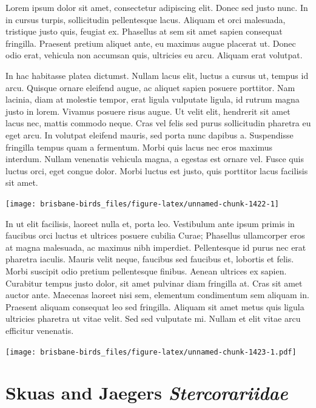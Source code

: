 \documentclass[]{book}
\let\origfigure\figure
\let\endorigfigure\endfigure
\renewenvironment{figure}[1][2] {
  \expandafter\origfigure\expandafter[H]
} {
  \endorigfigure
}
\begin{document}
Lorem ipsum dolor sit amet, consectetur adipiscing elit. Donec sed justo
nunc. In in cursus turpis, sollicitudin pellentesque lacus. Aliquam et
orci malesuada, tristique justo quis, feugiat ex. Phasellus at sem sit
amet sapien consequat fringilla. Praesent pretium aliquet ante, eu
maximus augue placerat ut. Donec odio erat, vehicula non accumsan quis,
ultricies eu arcu. Aliquam erat volutpat.

In hac habitasse platea dictumst. Nullam lacus elit, luctus a cursus ut,
tempus id arcu. Quisque ornare eleifend augue, ac aliquet sapien posuere
porttitor. Nam lacinia, diam at molestie tempor, erat ligula vulputate
ligula, id rutrum magna justo in lorem. Vivamus posuere risus augue. Ut
velit elit, hendrerit sit amet lacus nec, mattis commodo neque. Cras vel
felis sed purus sollicitudin pharetra eu eget arcu. In volutpat eleifend
mauris, sed porta nunc dapibus a. Suspendisse fringilla tempus quam a
fermentum. Morbi quis lacus nec eros maximus interdum. Nullam venenatis
vehicula magna, a egestas est ornare vel. Fusce quis luctus orci, eget
congue dolor. Morbi luctus est justo, quis porttitor lacus facilisis sit
amet.

\begin{figure}
\texttt{[image: brisbane-birds\_files/figure-latex/unnamed-chunk-1422-1]} \caption{insert figure caption}\label{fig:unnamed-chunk-1422}
\end{figure}

In ut elit facilisis, laoreet nulla et, porta leo. Vestibulum ante ipsum
primis in faucibus orci luctus et ultrices posuere cubilia Curae;
Phasellus ullamcorper eros at magna malesuada, ac maximus nibh
imperdiet. Pellentesque id purus nec erat pharetra iaculis. Mauris velit
neque, faucibus sed faucibus et, lobortis et felis. Morbi suscipit odio
pretium pellentesque finibus. Aenean ultrices ex sapien. Curabitur
tempus justo dolor, sit amet pulvinar diam fringilla at. Cras sit amet
auctor ante. Maecenas laoreet nisi sem, elementum condimentum sem
aliquam in. Praesent aliquam consequat leo sed fringilla. Aliquam sit
amet metus quis ligula ultricies pharetra ut vitae velit. Sed sed
vulputate mi. Nullam et elit vitae arcu efficitur venenatis.

\begin{figure}
\centering
\texttt{[image: brisbane-birds\_files/figure-latex/unnamed-chunk-1423-1.pdf]}
\caption{\label{fig:unnamed-chunk-1423}insert figure caption}
\end{figure}

\chapter{\texorpdfstring{Skuas and Jaegers
\emph{Stercorariidae}}{Skuas and Jaegers Stercorariidae}}\label{skuas-and-jaegers-stercorariidae}
\end{document}

